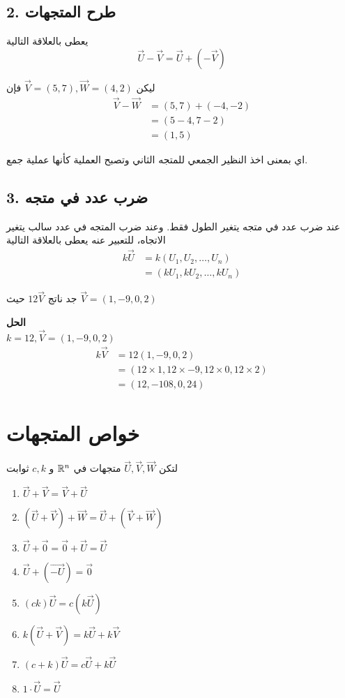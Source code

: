 \subsection*{2. طرح المتجهات}
يعطى بالعلاقة التالية
\[
\vec{U} - \vec{V} = \vec{U} + (-\vec{V})
\]

\begin{example}
	ليكن
	$\vec{V}=(5, 7), \vec{W} = (4,2)$
	فإن 
	\begin{align*}
		\vec{V}-\vec{W} &= (5,7) + (-4, -2)\\
		&= (5-4, 7-2)\\
		&= (1,5)
	\end{align*}
\end{example}
\noindent
اي بمعنى اخذ النظير الجمعي للمتجه الثاني وتصبح العملية كأنها عملية جمع.

\subsection*{3. ضرب عدد في متجه}
عند ضرب عدد في متجه يتغير الطول فقط. وعند ضرب المتجه في عدد سالب يتغير الاتجاه، للتعبير عنه يعطى بالعلاقة التالية
\begin{align*}
	k \vec{U} &= k(U_1, U_2, \dots, U_n)\\
	&= (kU_1, kU_2, \dots, kU_n)
\end{align*}

\begin{example}
	جد ناتج $12\vec{V}$ حيث $\vec{V}=(1,-9,0,2)$
\end{example}
\noindent
\textbf{الحل}\\
\noindent
$k=12, \vec{V}=(1,-9,0,2)$
\begin{align*}
	k\vec{V} &= 12(1,-9,0,2)\\
	&= (12\times1, 12\times-9, 12\times0, 12\times2)\\
	&= (12, -108, 0, 24)
\end{align*}
\newpage
\section{خواص المتجهات}
لتكن $\vec{U}, \vec{V}, \vec{W}$ متجهات في $\mathbb{R}^n$ و $c,k$ ثوابت
\begin{english}
	\begin{enumerate}
		\item $\vec{U} + \vec{V} = \vec{V} + \vec{U}$
		\item $(\vec{U} + \vec{V} )+ \vec{W} = \vec{U} + (\vec{V} + \vec{W})$
		\item $\vec{U}+\vec{0} = \vec{0} + \vec{U} = \vec{U}$
		\item $\vec{U} + (\vec{-U}) = \vec{0}$
		\item $(ck)\vec{U} = c(k\vec{U})$
		\item $k(\vec{U}+\vec{V}) = k\vec{U} + k\vec{V}$
		\item $(c+k)\vec{U} = c\vec{U} + k\vec{U}$
		\item $1\cdot \vec{U} = \vec{U}$
	\end{enumerate}
\end{english}

